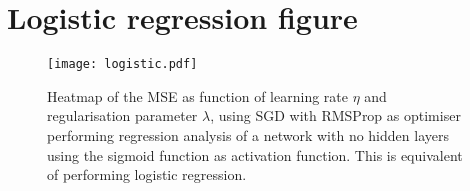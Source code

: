\clearpage

\section{Logistic regression figure}\label{app:logistic}

\begin{figure}[h!]
    \texttt{[image: logistic.pdf]}
    \caption{Heatmap of the MSE as function of learning rate $\eta$ and regularisation parameter $\lambda$, using SGD with RMSProp as optimiser performing regression analysis of a network with no hidden layers using the sigmoid function as activation function. This is equivalent of performing logistic regression.}
    \label{fig:logistic_eta_lambda}
\end{figure}


\clearpage

